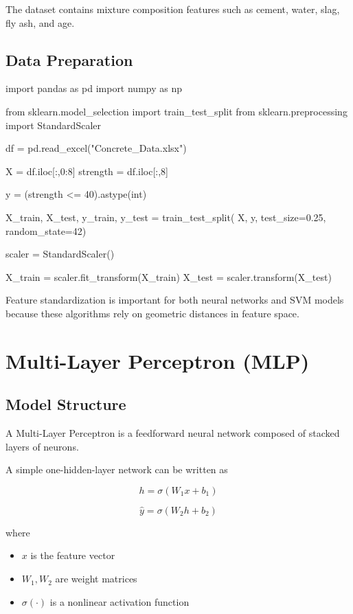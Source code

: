 \documentclass[12pt]{article}
\begin{document}
The dataset contains mixture composition features such as cement, water, slag, fly ash, and age.

\subsection{Data Preparation}

\begin{py-box}
import pandas as pd
import numpy as np

from sklearn.model_selection import train_test_split
from sklearn.preprocessing import StandardScaler

df = pd.read_excel("Concrete_Data.xlsx")

X = df.iloc[:,0:8]
strength = df.iloc[:,8]

y = (strength <= 40).astype(int)

X_train, X_test, y_train, y_test = train_test_split(
    X, y, test_size=0.25, random_state=42)

scaler = StandardScaler()

X_train = scaler.fit_transform(X_train)
X_test = scaler.transform(X_test)
\end{py-box}

Feature standardization is important for both neural networks and SVM models because these algorithms rely on geometric distances in feature space.

\section{Multi-Layer Perceptron (MLP)}

\subsection{Model Structure}

A Multi-Layer Perceptron is a feedforward neural network composed of stacked layers of neurons.

A simple one-hidden-layer network can be written as

\[
h = \sigma(W_1 x + b_1)
\]

\[
\hat{y} = \sigma(W_2 h + b_2)
\]

where

\begin{itemize}
\item $x$ is the feature vector
\item $W_1, W_2$ are weight matrices
\item $\sigma(\cdot)$ is a nonlinear activation function
\end{itemize}
\end{document}
